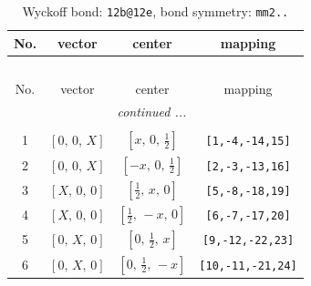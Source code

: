 \documentclass[fleqn,8pt]{jsarticle}
\begin{document}
\renewcommand{\arraystretch}{1.2}
\begin{longtable}{cccc}
\caption{Wyckoff bond: {\tt 12b@12e}, bond symmetry: {\tt mm2..}}
 \\
 \hline \hline
No. & vector & center & mapping \\ \hline \endfirsthead

\multicolumn{3}{l}{\tablename\ \thetable{}} \\
 \hline \hline
No. & vector & center & mapping \\ \hline \endhead

 \hline \hline
\multicolumn{3}{r}{\footnotesize\it continued ...} \\ \endfoot

 \hline \hline
\multicolumn{3}{r}{} \\ \endlastfoot

1 & $\left[ 0,\, 0,\, X \right]$ & $\left[ x,\, 0,\, \frac{1}{2} \right]$ & {\tt [1,-4,-14,15]} \\ \hline
2 & $\left[ 0,\, 0,\, X \right]$ & $\left[ - x,\, 0,\, \frac{1}{2} \right]$ & {\tt [2,-3,-13,16]} \\ \hline
3 & $\left[ X,\, 0,\, 0 \right]$ & $\left[ \frac{1}{2},\, x,\, 0 \right]$ & {\tt [5,-8,-18,19]} \\ \hline
4 & $\left[ X,\, 0,\, 0 \right]$ & $\left[ \frac{1}{2},\, - x,\, 0 \right]$ & {\tt [6,-7,-17,20]} \\ \hline
5 & $\left[ 0,\, X,\, 0 \right]$ & $\left[ 0,\, \frac{1}{2},\, x \right]$ & {\tt [9,-12,-22,23]} \\ \hline
6 & $\left[ 0,\, X,\, 0 \right]$ & $\left[ 0,\, \frac{1}{2},\, - x \right]$ & {\tt [10,-11,-21,24]} \\
\end{longtable}
\renewcommand{\arraystretch}{1.2}
\end{document}
